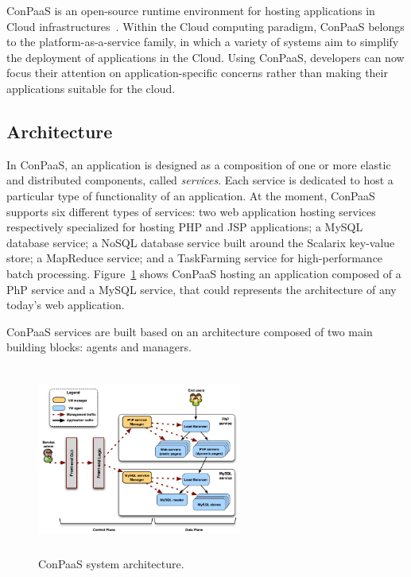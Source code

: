 

ConPaaS is an open-source runtime environment for hosting applications in Cloud infrastructures~\cite{conpaasIC}.
Within the Cloud computing paradigm, ConPaaS belongs to the platform-as-a-service family, 
in which a variety of systems aim to simplify the deployment of applications in the Cloud. Using ConPaaS,  developers can now focus their attention on application-specific concerns rather than making their applications suitable for the cloud. 

\subsection*{Architecture}

In ConPaaS, an application is designed as a composition of one or more elastic and distributed components, called \emph{services}. Each service is dedicated to host a particular type of functionality of an application. At the moment, ConPaaS supports six different types of services: two web application hosting services respectively specialized for hosting PHP and JSP applications; a MySQL database service; a NoSQL database service built around the Scalarix key-value store; a MapReduce service; and a TaskFarming service for high-performance batch processing.  Figure~\ref{arch} shows ConPaaS hosting an application composed of a PhP service and a MySQL service, that could represents the architecture of any today's web application.

ConPaaS services are built based on an architecture composed of two main building blocks: agents and managers.

\begin{figure}[Ht]
\begin{center}
\includegraphics[width=0.6\textwidth, height=6.2cm]{./images/conpaasSystemArch}
\end{center}
\caption{ConPaaS system architecture.}
\label{arch}
\end{figure}



